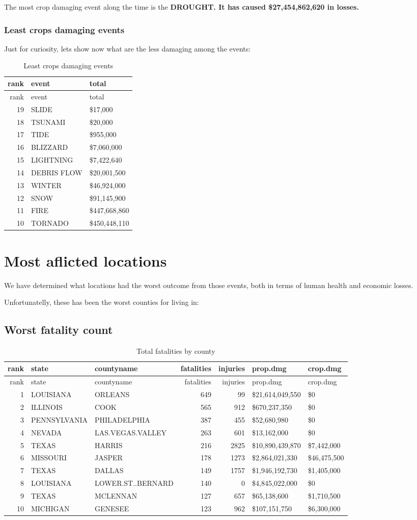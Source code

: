 \documentclass[]{article}
\begin{document}
The most crop damaging event along the time is the \textbf{DROUGHT. It
has caused \$27,454,862,620 in losses.}

\subsubsection{Least crops damaging
events}\label{least-crops-damaging-events}

Just for curiosity, lets show now what are the less damaging among the
events:

\begin{longtable}[]{@{}rll@{}}
\caption{Least crops damaging events}\tabularnewline
\toprule
rank & event & total\tabularnewline
\midrule
\endfirsthead
\toprule
rank & event & total\tabularnewline
\midrule
\endhead
19 & SLIDE & \$17,000\tabularnewline
18 & TSUNAMI & \$20,000\tabularnewline
17 & TIDE & \$955,000\tabularnewline
16 & BLIZZARD & \$7,060,000\tabularnewline
15 & LIGHTNING & \$7,422,640\tabularnewline
14 & DEBRIS FLOW & \$20,001,500\tabularnewline
13 & WINTER & \$46,924,000\tabularnewline
12 & SNOW & \$91,145,900\tabularnewline
11 & FIRE & \$447,668,860\tabularnewline
10 & TORNADO & \$450,448,110\tabularnewline
\bottomrule
\end{longtable}

\section{Most aflicted locations}\label{most-aflicted-locations}

We have determined what locations had the worst outcome from those
events, both in terms of human health and economic losses.

Unfortunatelly, these has been the worst counties for living in:

\subsection{Worst fatality count}\label{worst-fatality-count}

\begin{longtable}[]{@{}rllrrll@{}}
\caption{Total fatalities by county}\tabularnewline
\toprule
rank & state & countyname & fatalities & injuries & prop.dmg &
crop.dmg\tabularnewline
\midrule
\endfirsthead
\toprule
rank & state & countyname & fatalities & injuries & prop.dmg &
crop.dmg\tabularnewline
\midrule
\endhead
1 & LOUISIANA & ORLEANS & 649 & 99 & \$21,614,049,550 &
\$0\tabularnewline
2 & ILLINOIS & COOK & 565 & 912 & \$670,237,350 & \$0\tabularnewline
3 & PENNSYLVANIA & PHILADELPHIA & 387 & 455 & \$52,680,980 &
\$0\tabularnewline
4 & NEVADA & LAS.VEGAS.VALLEY & 263 & 601 & \$13,162,000 &
\$0\tabularnewline
5 & TEXAS & HARRIS & 216 & 2825 & \$10,890,439,870 &
\$7,442,000\tabularnewline
6 & MISSOURI & JASPER & 178 & 1273 & \$2,864,021,330 &
\$46,475,500\tabularnewline
7 & TEXAS & DALLAS & 149 & 1757 & \$1,946,192,730 &
\$1,405,000\tabularnewline
8 & LOUISIANA & LOWER.ST..BERNARD & 140 & 0 & \$4,845,022,000 &
\$0\tabularnewline
9 & TEXAS & MCLENNAN & 127 & 657 & \$65,138,600 &
\$1,710,500\tabularnewline
10 & MICHIGAN & GENESEE & 123 & 962 & \$107,151,750 &
\$6,300,000\tabularnewline
\bottomrule
\end{longtable}
\end{document}
